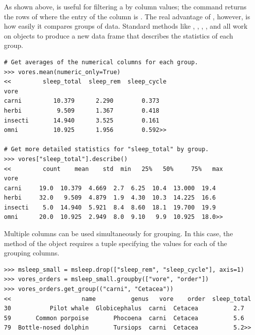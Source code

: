 As shown above,  is useful for filtering a  by column values;
the command  returns the rows of  where the entry of the  column is .
The real advantage of , however, is how easily it compares groups of data.
Standard  methods like , , , , and  all work on  objects to produce a new data frame that describes the statistics of each group.

\begin{lstlisting}
# Get averages of the numerical columns for each group.
>>> vores.mean(numeric_only=True)
<<         sleep_total  sleep_rem  sleep_cycle
vore
carni         10.379      2.290        0.373
herbi          9.509      1.367        0.418
insecti       14.940      3.525        0.161
omni          10.925      1.956        0.592>>

# Get more detailed statistics for "sleep_total" by group.
>>> vores["sleep_total"].describe()
<<         count    mean    std  min   25%   50%     75%   max
vore
carni     19.0  10.379  4.669  2.7  6.25  10.4  13.000  19.4
herbi     32.0   9.509  4.879  1.9  4.30  10.3  14.225  16.6
insecti    5.0  14.940  5.921  8.4  8.60  18.1  19.700  19.9
omni      20.0  10.925  2.949  8.0  9.10   9.9  10.925  18.0>>
\end{lstlisting}

Multiple columns can be used simultaneously for grouping.
In this case, the  method of the  object requires a tuple specifying the values for each of the grouping columns.

\begin{lstlisting}
>>> msleep_small = msleep.drop(["sleep_rem", "sleep_cycle"], axis=1)
>>> vores_orders = msleep_small.groupby(["vore", "order"])
>>> vores_orders.get_group(("carni", "Cetacea"))
<<                    name          genus   vore    order  sleep_total
30           Pilot whale  Globicephalus  carni  Cetacea          2.7
59       Common porpoise       Phocoena  carni  Cetacea          5.6
79  Bottle-nosed dolphin       Tursiops  carni  Cetacea          5.2>>
\end{lstlisting}

